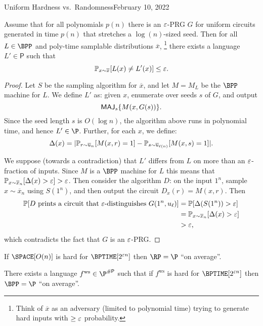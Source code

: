 \begin{lecture}{4}{Uniform Hardness vs.\ Randomness}{February 10, 2022}
\begin{theorem}
  Assume that for all polynomials $p(n)$ there is an $\varepsilon$-PRG $G$ for uniform
  circuits generated in time $p(n)$ that stretches a $\log(n)$-sized seed. Then
  for all $L \in \BPP$ and poly-time samplable distributions $\overline{x}$,%
  \footnote{Think of $\overline{x}$ as an adversary (limited to polynomial
  time) trying to generate hard inputs with $\geq \varepsilon$ probability.} there
  exists a language $L' \in \textsf{P}$ such that
	\[
		\mathbb{P}_{x \sim \overline{x}}[L(x) \neq L'(x)] \leq \varepsilon.
	\]
\end{theorem}

\begin{proof}
	Let $S$ be the sampling algorithm for $\overline{x}$, and let $M = M_L$
	be the $\BPP$ machine for $L$. We define $L'$ as: given $x$, enumerate
	over seeds $s$ of $G$, and output
	\[ \textsf{MAJ}_{s} \{M(x, G(s)) \}. \]
	Since the seed length $s$ is $O(\log n)$, the algorithm above runs in
	polynomial time, and hence $L' \in \P$.
	Further, for each $x$, we define:
	\[
		\Delta(x) = \lvert
			\mathbb{P}_{r \sim \overline{u}_n}         [ M(x, r) = 1]
		  - \mathbb{P}_{s \sim \overline{u}_{\ell(n)}} [ M(x, s) = 1]
		  \rvert.
	\]

	We suppose (towards a contradiction) that $L'$ differs from $L$ on more
	than an $\varepsilon$-fraction of inputs. Since $M$ is a $\BPP$ machine for $L$
	this means that
	$\mathbb{P}_{x \sim \overline{x}_n}[\Delta(x) > \varepsilon] > \varepsilon$. Then consider
	the algorithm $D$: on the input $1^n$, sample $x \sim \overline{x}_n$ using
	$S(1^n)$, and then output the circuit $D_x(r) = M(x, r)$.
	Then
  \begin{align*}
		\mathbb{P}[D \text{ prints a circuit that } \varepsilon \text{-distinguishes } G(1^n, u_{\ell})]
    &= \mathbb{P}[\Delta(S(1^n)) > \varepsilon]\\
    &= \mathbb{P}_{x \sim \overline{x}_n}[\Delta(x) > \varepsilon]\\
    &> \varepsilon,
  \end{align*}
	which contradicts the fact that $G$ is an $\varepsilon$-PRG.
\end{proof}

\begin{theorem}
	If
	$\SPACE\brac{O(n)}$ is hard for $\BPTIME\brac{2^{\eps n}}$
	then
	$\RP = \P$ ``on average''.
\end{theorem}

\newcommand{\fws}{\ensuremath{ f^{\text{ws}} }}
\begin{theorem}
	There exists a language $\fws \in \P^{\sharpp}$ such that if $\fws$
	is hard for $\BPTIME\brac{2^{\eps n}}$ then
	$\BPP = \P$ ``on average''.
\end{theorem}


\end{lecture}
